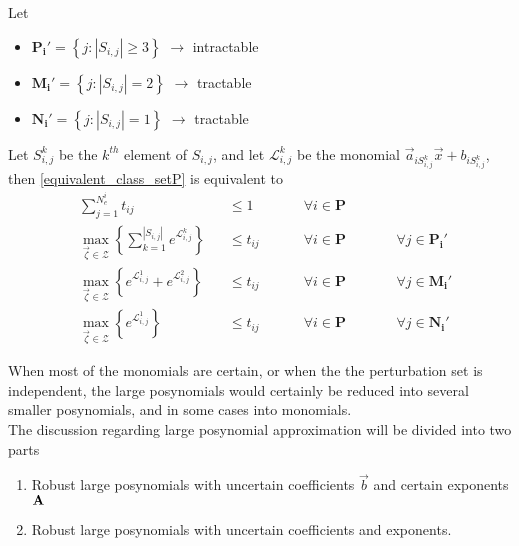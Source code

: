 Let
\begin{itemize}
\item $\mathbf{P_i'} = \left\{j:|S_{i,j}| \geq 3\right\}$ $\rightarrow$ intractable
\item $\mathbf{M_i'} = \left\{j:|S_{i,j}| = 2\right\}$ $\rightarrow$ tractable
\item $\mathbf{N_i'} = \left\{j:|S_{i,j}| = 1\right\}$ $\rightarrow$ tractable
\end{itemize}
Let $S_{i,j}^k$ be the $k^{th}$ element of $S_{i,j}$, and let $\mathcal{L}_{i,j}^k$ be the monomial $\vec{a}_{iS_{i,j}^k}\vec{x} + b_{iS_{i,j}^k}$, then \eqref{equivalent_class_setP} is equivalent to
\begin{equation}
\begin{aligned}
&\textstyle{\sum}_{j=1}^{N_e^i} t_{ij} &&\leq 1 \qquad &&\forall i \in \mathbf{P}\\
&\max_{\vec{\zeta} \in \mathcal{Z}} \left\{\textstyle{\sum}_{k=1}^{|S_{i,j}|} e^{\mathcal{L}_{i,j}^k} \right\} &&\leq t_{ij} &&\forall i \in \mathbf{P} \qquad &&\forall j \in \mathbf{P_i'}\\
&\max_{\vec{\zeta} \in \mathcal{Z}} \left\{e^{\mathcal{L}_{i,j}^1} + e^{\mathcal{L}_{i,j}^2} \right\} &&\leq t_{ij} &&\forall i \in \mathbf{P} \qquad &&\forall j \in \mathbf{M_i'}\\
&\max_{\vec{\zeta} \in \mathcal{Z}} \left\{e^{\mathcal{L}_{i,j}^1} \right\} &&\leq t_{ij} &&\forall i \in \mathbf{P} \qquad &&\forall j \in \mathbf{N_i'}
\end{aligned}
\label{equivalent_class_setP_separated}
\end{equation}

When most of the monomials are certain, or when the the perturbation set is independent, the large posynomials would certainly be reduced into several smaller posynomials, and in some cases into monomials.\\[12pt]
The discussion regarding large posynomial approximation will be divided into two parts
\begin{enumerate}
\item Robust large posynomials with uncertain coefficients $\vec{b}$ and certain exponents $\mathbf{A}$
\item Robust large posynomials with uncertain coefficients and exponents.
\end{enumerate}

